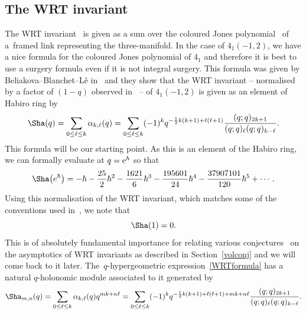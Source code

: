 \documentclass[pdftex]{sigma}
\numberwithin{equation}{section}
\def\be{\begin{equation}}
\def\ee{\end{equation}}
\def\WRT{\Sha}
\def\be{\begin{equation}}
\def\ee{\end{equation}}
\begin{document}
\subsection{The WRT invariant}%

The WRT invariant~\cite{RT:3man} is given as a sum over the coloured Jones polynomial~\cite{Jones,JonesII,RT:rib} of a~framed link representing the three-manifold. In the case of $4_{1}(-1,2)$, we have a nice formula for the coloured Jones polynomial of $4_1$ and therefore it is best to use a surgery formula even if it is not integral surgery. This formula was given by Beliakova--Blanchet--L\^e in~\cite{BelBlaLe} and they show that the WRT invariant -- normalised by a factor of $(1-q)$ observed in~\cite{LawrenceZag} -- of $4_1(-1,2)$ is given as an element of Habiro ring by
\be\label{WRTformula}
 \WRT(q)  =
 \sum_{0\leq\ell\leq k}\alpha_{k,\ell}(q)
  =
 \sum_{0\leq\ell\leq k}(-1)^{k}q^{-\frac{1}{2}k(k+1)+\ell(\ell+1)}\frac{(q;q)_{2k+1}}{(q;q)_{\ell}(q;q)_{k-\ell}} .
\ee
This formula will be our starting point. As this is an element of the Habiro ring, we can formally evaluate at $q={\rm e}^\hbar$ so that
\[
 \WRT\bigl(e^\hbar\bigr) =-\hbar -\frac{25}{2}\hbar^2 - \frac{1621}{6}\hbar^3 - \frac{195601}{24}\hbar^4 - \frac{37907101}{120}\hbar^5+\cdots .
\]
Using this normalisation of the WRT invariant, which matches some of the conventions used in~\cite{LawrenceZag}, we note that
\[
 \WRT(1) =0 .
\]
This is of absolutely fundamental importance for relating various conjectures~\cite{ChenYang,Witten} on the asymptotics of WRT invariants as described in Section~\ref{volconj} and we will come back to it later.
The~$q$-hypergeometric expression~\eqref{WRTformula} has a natural $q$-holonomic module associated to it generated by
\[
 \WRT_{m,n}(q)
  =
 \sum_{0\leq\ell\leq k}\alpha_{k,\ell}(q)q^{mk+n\ell}
  =
 \sum_{0\leq\ell\leq k}(-1)^{k}q^{-\frac{1}{2}k(k+1)+\ell(\ell+1)+mk+n\ell}\frac{(q;q)_{2k+1}}{(q;q)_{\ell}(q;q)_{k-\ell}} .
\]
\end{document}
